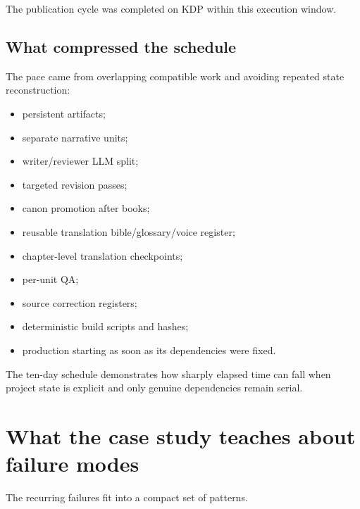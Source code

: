 \documentclass[11pt,oneside,openany]{book}
\providecommand{\tightlist}{%
  \setlength{\itemsep}{0pt}\setlength{\parskip}{0pt}}
\begin{document}
The publication cycle was completed on KDP within this execution window.

\section{What compressed the schedule}\label{what-compressed-the-schedule}

The pace came from overlapping compatible work and avoiding repeated state reconstruction:

\begin{itemize}
\tightlist
\item
  persistent artifacts;
\item
  separate narrative units;
\item
  writer/reviewer LLM split;
\item
  targeted revision passes;
\item
  canon promotion after books;
\item
  reusable translation bible/glossary/voice register;
\item
  chapter-level translation checkpoints;
\item
  per-unit QA;
\item
  source correction registers;
\item
  deterministic build scripts and hashes;
\item
  production starting as soon as its dependencies were fixed.
\end{itemize}

The ten-day schedule demonstrates how sharply elapsed time can fall when project state is explicit and only genuine dependencies remain serial.

\chapter{What the case study teaches about failure modes}

The recurring failures fit into a compact set of patterns.
\end{document}
